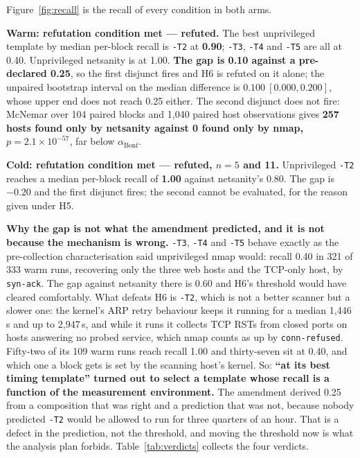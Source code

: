 \documentclass[conference]{IEEEtran}
\newcommand{\netsanity}{\textsf{netsanity}}
\newcommand{\Refuted}{\textbf{refuted}}
\begin{document}
Figure~\ref{fig:recall} is the recall of every condition in both arms.

\textbf{Warm: refutation condition met --- \Refuted{}.} The best unprivileged
template by median per-block recall is \texttt{-T2} at \textbf{0.90};
\texttt{-T3}, \texttt{-T4} and \texttt{-T5} are all at 0.40. Unprivileged
\netsanity{} is at 1.00. \textbf{The gap is 0.10 against a pre-declared 0.25},
so the first disjunct fires and H6 is refuted on it alone; the unpaired
bootstrap interval on the median difference is $0.100\ [0.000,0.200]$, whose
upper end does not reach 0.25 either. The second disjunct does not fire:
McNemar over 104 paired blocks and 1{,}040 paired host observations gives
\textbf{257 hosts found only by \netsanity{} against 0 found only by nmap,
$p=2.1\times10^{-57}$}, far below $\alpha_{\mathrm{Bonf}}$.

\textbf{Cold: refutation condition met --- \Refuted{}, $n=5$ and 11.}
Unprivileged \texttt{-T2} reaches a median per-block recall of \textbf{1.00}
against \netsanity{}'s 0.80. The gap is $\mathbf{-0.20}$ and the first disjunct
fires; the second cannot be evaluated, for the reason given under H5.

\textbf{Why the gap is not what the amendment predicted, and it is not because
the mechanism is wrong.} \texttt{-T3}, \texttt{-T4} and \texttt{-T5} behave
exactly as the pre-collection characterisation said unprivileged nmap would:
recall 0.40 in 321 of 333 warm runs, recovering only the three web hosts and
the TCP-only host, by \texttt{syn-ack}. The gap against \netsanity{} there is
0.60 and H6's threshold would have cleared comfortably. What defeats H6 is
\texttt{-T2}, which is not a better scanner but a slower one: the kernel's ARP
retry behaviour keeps it running for a median 1{,}446\,s and up to 2{,}947\,s,
and while it runs it collects TCP RSTs from closed ports on hosts answering no
probed service, which nmap counts as up by \texttt{conn-refused}. Fifty-two of
its 109 warm runs reach recall 1.00 and thirty-seven sit at 0.40, and which one
a block gets is set by the scanning host's kernel. So: \textbf{``at its best
timing template'' turned out to select a template whose recall is a function of
the measurement environment.} The amendment derived 0.25 from a composition
that was right and a prediction that was not, because nobody predicted
\texttt{-T2} would be allowed to run for three quarters of an hour. That is a
defect in the prediction, not the threshold, and moving the threshold now is
what the analysis plan forbids. Table~\ref{tab:verdicts} collects the four
verdicts.
\end{document}
